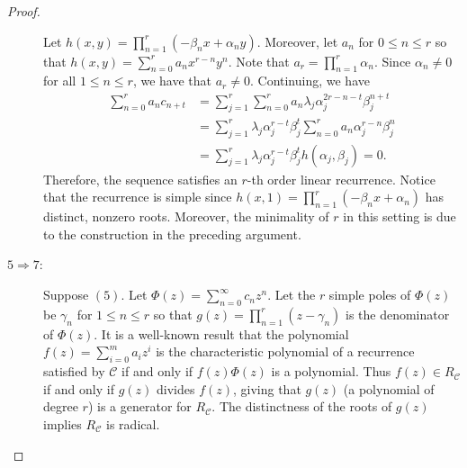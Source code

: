 \documentclass[12pt,reqno]{article}
\begin{document}
\begin{proof}
\begin{description}
Let $h(x,y) = \prod_{n=1}^r (-\beta_n x+\alpha_n y)$. Moreover, let $a_n$ for $0\leq n \leq r$ so that $h(x,y) = \sum_{n=0}^r a_nx^{r-n}y^{n}$. Note that $a_r = \prod_{n=1}^r \alpha_n$. Since $\alpha_n\neq0$ for all $1\leq n\leq r$, we have that $a_r\neq 0$. Continuing, we have 
\begin{align*}
\sum_{n=0}^r a_n c_{n+t} &= \sum_{j=1}^r \sum_{n=0}^r a_n \lambda_j \alpha_j^{2r-n-t} \beta_j^{n+t} \\
& = \sum_{j=1}^r \lambda_j \alpha_j^{r-t} \beta_j^{t} \sum_{n=0}^r a_n  \alpha_j^{r-n} \beta_j^{n} \\
&= \sum_{j=1}^r \lambda_j \alpha_j^{r-t} \beta_j^{t} h(\alpha_j,\beta_j) = 0. 
\end{align*}
Therefore, the sequence satisfies an $r$-th order linear recurrence. Notice that the recurrence is simple since $h(x,1) = \prod_{n=1}^r (-\beta_n x+\alpha_n )$ has distinct, nonzero roots. Moreover, the minimality of $r$ in this setting is due to the construction in the preceding argument. 
\item[$5 \Rightarrow 7$:] Suppose $(5)$. Let $\Phi(z) = \sum_{n=0}^\infty c_n z^n$. Let the $r$ simple poles of $\Phi(z)$ be $\gamma_n$ for $1\leq n\leq r$ so that $g(z) = \prod_{n=1}^r (z-\gamma_n)$ is the denominator of $\Phi(z)$. It is a well-known result \cite{EvePooShpWar2003} that the polynomial $f(z) = \sum_{i=0}^m a_i z^i$ is the characteristic polynomial of a recurrence satisfied by $\mathcal{C}$ if and only if $f(z)\Phi(z)$ is a polynomial. Thus $f(z)\in R_{\mathcal{C}}$ if and only if $g(z)$ divides $f(z)$, giving that $g(z)$ (a polynomial of degree $r$) is a generator for $R_{\mathcal{C}}$. The distinctness of the roots of $g(z)$ implies $R_{\mathcal{C}}$ is radical. 


\end{description}
\end{proof}
\end{document}
